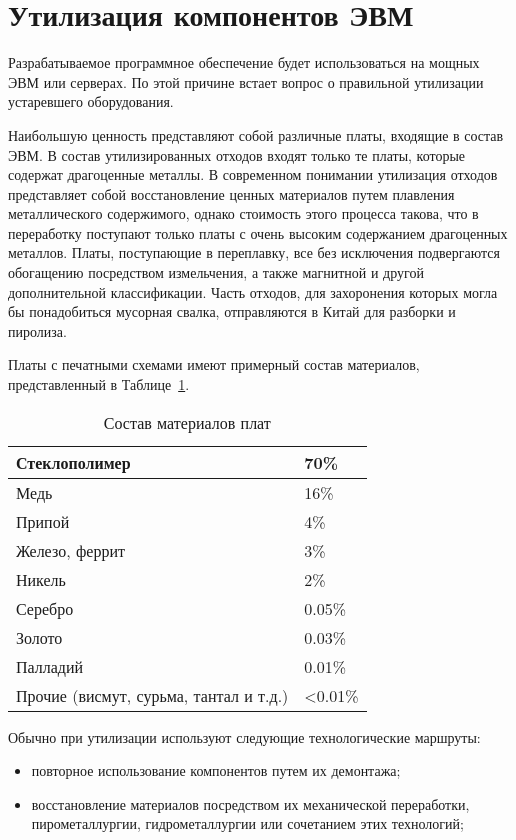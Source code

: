 \section{Утилизация компонентов ЭВМ}
Разрабатываемое программное обеспечение будет использоваться на мощных ЭВМ или серверах. По этой причине встает вопрос о правильной утилизации устаревшего оборудования.

Наибольшую ценность представляют собой различные платы, входящие в состав ЭВМ. В состав утилизированных отходов входят только те платы, которые содержат драгоценные металлы. В современном понимании утилизация отходов представляет собой восстановление ценных материалов путем плавления металлического содержимого, однако стоимость этого процесса такова, что в переработку поступают только платы с очень высоким содержанием драгоценных металлов. Платы, поступающие в переплавку, все без исключения подвергаются обогащению посредством измельчения, а также магнитной и другой дополнительной классификации. Часть отходов, для захоронения которых могла бы понадобиться мусорная свалка, отправляются в Китай для разборки и пиролиза.

Платы с печатными схемами имеют примерный состав материалов, представленный в Таблице~\ref{table:sos_plat}.

\begin{table}
\caption{Состав материалов плат}
\label{table:sos_plat}
\begin{tabular}{| l | l |}
\hline
Стеклополимер & 70\%\\
\hline
Медь & 16\%\\
\hline
Припой & 4\%\\
\hline
Железо, феррит & 3\%\\
\hline
Никель & 2\%\\
\hline
Серебро & 0.05\%\\
\hline
Золото & 0.03\%\\
\hline
Палладий & 0.01\%\\
\hline
Прочие (висмут, сурьма, тантал и т.д.) & <0.01\%\\
\hline
\end{tabular}
\end{table}

Обычно при утилизации используют следующие технологические маршруты:
\begin{itemize}
\item повторное использование компонентов путем их демонтажа;
\item восстановление материалов посредством их механической переработки, пирометаллургии, гидрометаллургии или сочетанием этих технологий;
\end{itemize}

